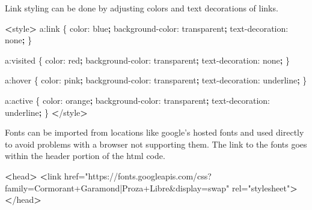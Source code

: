\documentclass[]{book}
\newenvironment{Shaded}{\begin{snugshade}}{\end{snugshade}}
\newcommand{\KeywordTok}[1]{\textcolor[rgb]{0.13,0.29,0.53}{\textbf{#1}}}
\newcommand{\StringTok}[1]{\textcolor[rgb]{0.31,0.60,0.02}{#1}}
\newcommand{\FunctionTok}[1]{\textcolor[rgb]{0.00,0.00,0.00}{#1}}
\newcommand{\OperatorTok}[1]{\textcolor[rgb]{0.81,0.36,0.00}{\textbf{#1}}}
\newcommand{\ExtensionTok}[1]{#1}
\newcommand{\NormalTok}[1]{#1}
\begin{document}
Link styling can be done by adjusting colors and text decorations of
links.

\begin{Shaded}
\begin{Highlighting}[]
\OperatorTok{<}\ExtensionTok{style}\OperatorTok{>}                             
    \ExtensionTok{a}\NormalTok{:link \{                        }
      \ExtensionTok{color}\NormalTok{: blue}\KeywordTok{;}                  
      \ExtensionTok{background-color}\NormalTok{: transparent}\KeywordTok{;}
      \ExtensionTok{text-decoration}\NormalTok{: none}\KeywordTok{;}        
\NormalTok{    \}                               }
                                    
    \ExtensionTok{a}\NormalTok{:visited \{                     }
      \ExtensionTok{color}\NormalTok{: red}\KeywordTok{;}                   
      \ExtensionTok{background-color}\NormalTok{: transparent}\KeywordTok{;}
      \ExtensionTok{text-decoration}\NormalTok{: none}\KeywordTok{;}        
\NormalTok{    \}                               }
                                    
    \ExtensionTok{a}\NormalTok{:hover \{                       }
      \ExtensionTok{color}\NormalTok{: pink}\KeywordTok{;}                  
      \ExtensionTok{background-color}\NormalTok{: transparent}\KeywordTok{;}
      \ExtensionTok{text-decoration}\NormalTok{: underline}\KeywordTok{;}   
\NormalTok{    \}                               }
                                    
    \ExtensionTok{a}\NormalTok{:active \{                      }
      \ExtensionTok{color}\NormalTok{: orange}\KeywordTok{;}                
      \ExtensionTok{background-color}\NormalTok{: transparent}\KeywordTok{;}
      \ExtensionTok{text-decoration}\NormalTok{: underline}\KeywordTok{;}   
\NormalTok{    \}                               }
\OperatorTok{<}\NormalTok{/}\ExtensionTok{style}\OperatorTok{>}                            
\end{Highlighting}
\end{Shaded}

Fonts can be imported from locations like google's hosted fonts and used
directly to avoid problems with a browser not supporting them. The link
to the fonts goes within the header portion of the html code.

\begin{Shaded}
\begin{Highlighting}[]
\OperatorTok{<}\FunctionTok{head}\OperatorTok{>}
    \OperatorTok{<}\FunctionTok{link}\NormalTok{ href=}\StringTok{"https://fonts.googleapis.com/css?family=Cormorant+Garamond|Proza+Libre&display=swap"}\NormalTok{ rel=}\StringTok{"stylesheet"}\OperatorTok{>}
\OperatorTok{<}\NormalTok{/}\ExtensionTok{head}\OperatorTok{>}
\end{Highlighting}
\end{Shaded}
\end{document}

